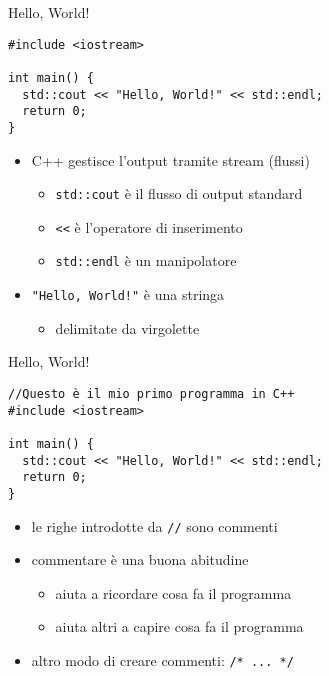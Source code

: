 \begin{frame}[fragile]{Hello, World!}
  \vfill
  \begin{lstlisting}
#include <iostream>

int main() {
  std::cout << "Hello, World!" << std::endl;
  return 0;
}
  \end{lstlisting}
  \vfill
  \begin{itemize}
    \item C++ gestisce l'output tramite \alert{stream} (flussi)
    \begin{itemize}
      \item \lstinline$std::cout$ è il flusso di output standard
      \item \lstinline$<<$ è l'operatore di \alert{inserimento}
      \item \lstinline$std::endl$ è un \alert{manipolatore}
    \end{itemize}
    \vfill
    \item \lstinline$"Hello, World!"$ è una \alert{stringa}
    \begin{itemize}
      \item delimitate da \alert{virgolette}
    \end{itemize}
  \end{itemize}
  \vfill
\end{frame}

\begin{frame}[fragile]{Hello, World!}
  \vfill
  \begin{lstlisting}
//Questo è il mio primo programma in C++
#include <iostream>

int main() {
  std::cout << "Hello, World!" << std::endl;
  return 0;
}
  \end{lstlisting}
  \vfill
  \begin{itemize}
    \item le righe introdotte da \lstinline$//$ sono \alert{commenti}
    \vfill
    \item commentare è una buona abitudine
    \begin{itemize}
      \item aiuta a ricordare cosa fa il programma
      \item aiuta altri a capire cosa fa il programma
    \end{itemize}
    \vfill
    \item altro modo di creare commenti: \lstinline$/* ... */$
  \end{itemize}
  \vfill
\end{frame}

